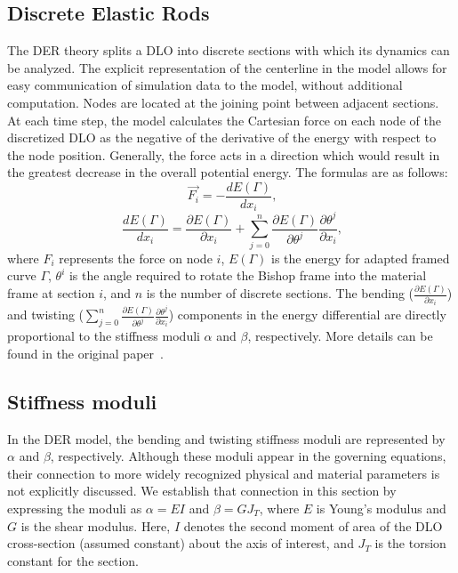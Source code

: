 \documentclass[letterpaper, 10 pt, conference]{ieeeconf}  %
\begin{document}
\subsection{Discrete Elastic Rods}
The DER theory splits a DLO into discrete sections with which its dynamics can be analyzed. The explicit representation of the centerline in the model allows for easy communication of simulation data to the model, without additional computation. Nodes are located at the joining point between adjacent sections. At each time step, the model calculates the Cartesian force on each node of the discretized DLO as the negative of the derivative of the energy with respect to the node position. Generally, the force acts in a direction which would result in the greatest decrease in the overall potential energy. The formulas are as follows:
\begin{equation}
	\label{eq:fi0}
	\ \vec{F_{i}} = -\frac{dE(\Gamma)}{dx_{i}},
\end{equation}
\begin{equation}
	\label{eq:fi1}
	\ \frac{dE(\Gamma)}{dx_{i}} = \frac{\partial E(\Gamma)}{\partial x_{i}} + \sum_{j=0}^{n} \frac{\partial E(\Gamma)}{\partial \theta^{j}} \frac{\partial \theta^{j}}{\partial x_{i}},
\end{equation}
where $F_{i}$ represents the force on node $i$, $E(\Gamma)$ is the energy for adapted framed curve $\Gamma$, $\theta^{i}$ is the angle required to rotate the Bishop frame into the material frame at section $i$, and $n$ is the number of discrete sections. The bending ($\frac{\partial E(\Gamma)}{\partial x_{i}}$) and twisting ($\sum_{j=0}^{n} \frac{\partial E(\Gamma)}{\partial \theta^{j}} \frac{\partial \theta^{j}}{\partial x_{i}}$) components in the energy differential are directly proportional to the stiffness moduli $\alpha$ and $\beta$, respectively. More details can be found in the original paper~\cite{bergou2008discrete}.


\subsection{Stiffness moduli}
\label{section:stiffmod}
In the DER model, the bending and twisting stiffness moduli are represented by $\alpha$ and $\beta$, respectively. Although these moduli appear in the governing equations, their connection to more widely recognized physical and material parameters is not explicitly discussed. We establish that connection in this section by expressing the moduli as $\alpha = EI$ and $\beta = GJ_T$, where $E$ is Young's modulus and $G$ is the shear modulus. Here, $I$ denotes the second moment of area of the DLO cross-section (assumed constant) about the axis of interest, and $J_T$ is the torsion constant for the section.
\end{document}
